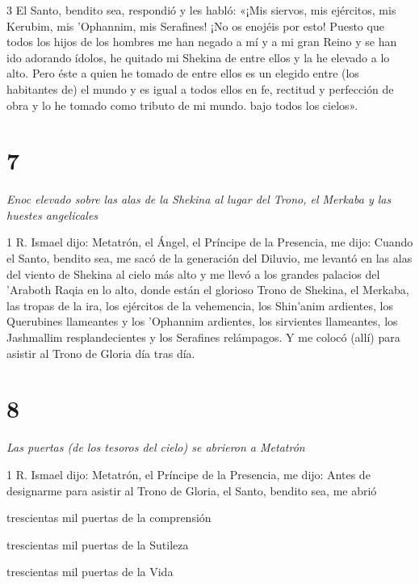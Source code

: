 \par 3 El Santo, bendito sea, respondió y les habló: «¡Mis siervos, mis ejércitos, mis Kerubim, mis 'Ophannim, mis Serafines! ¡No os enojéis por esto! Puesto que todos los hijos de los hombres me han negado a mí y a mi gran Reino y se han ido adorando ídolos, he quitado mi Shekina de entre ellos y la he elevado a lo alto. Pero éste a quien he tomado de entre ellos es un elegido entre (los habitantes de) el mundo y es igual a todos ellos en fe, rectitud y perfección de obra y lo he tomado como tributo de mi mundo. bajo todos los cielos».

\chapter{7}

\par \textit{Enoc elevado sobre las alas de la Shekina al lugar del Trono, el Merkaba y las huestes angelicales}

\par 1 R. Ismael dijo: Metatrón, el Ángel, el Príncipe de la Presencia, me dijo: Cuando el Santo, bendito sea, me sacó de la generación del Diluvio, me levantó en las alas del viento de Shekina al cielo más alto y me llevó a los grandes palacios del 'Araboth Raqia en lo alto, donde están el glorioso Trono de Shekina, el Merkaba, las tropas de la ira, los ejércitos de la vehemencia, los Shin'anim ardientes, los Querubines llameantes y los 'Ophannim ardientes, los sirvientes llameantes, los Jashmallim resplandecientes y los Serafines relámpagos. Y me colocó (allí) para asistir al Trono de Gloria día tras día.

\chapter{8}

\par \textit{Las puertas (de los tesoros del cielo) se abrieron a Metatrón}

\par 1 R. Ismael dijo: Metatrón, el Príncipe de la Presencia, me dijo: Antes de designarme para asistir al Trono de Gloria, el Santo, bendito sea, me abrió

\par trescientas mil puertas de la comprensión

\par trescientas mil puertas de la Sutileza

\par trescientas mil puertas de la Vida


